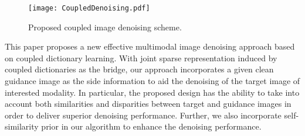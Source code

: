 \documentclass{article}
\begin{document}
%

%

\begin{figure}[t]
	\centering
	\texttt{[image: CoupledDenoising.pdf]}  
	\caption{Proposed coupled image denoising scheme.}
	\label{Fig:Diagram}
\end{figure}



This paper proposes a new effective multimodal image denoising approach based on coupled dictionary learning. With joint sparse representation induced by coupled dictionaries as the bridge, our approach incorporates a given clean guidance image as the side information to aid the denoising of the target image of interested modality. In particular, the proposed design has the ability to take into account both similarities and disparities between target and guidance images in order to deliver superior denoising performance. Further, we also incorporate self-similarity prior in our algorithm to enhance the denoising performance.
\end{document}
